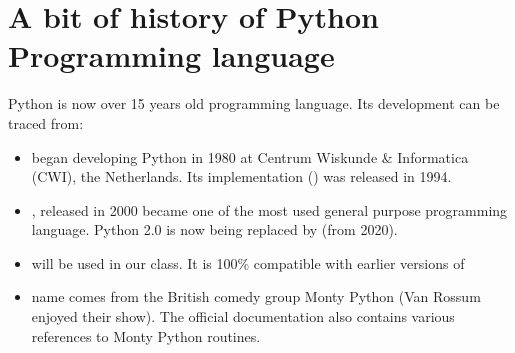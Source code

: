 \documentclass[letterpaper,10pt,english]{jupyterBook}
\begin{document}
\section{A bit of history of Python Programming language}
\label{\detokenize{content/background/01_python:a-bit-of-history-of-python-programming-language}}
\sphinxAtStartPar
Python is now over 15 years old programming language. Its development can be traced from:
\begin{itemize}
\item {} 
\sphinxAtStartPar
{} began developing Python in 1980 at Centrum Wiskunde \& Informatica (CWI), the Netherlands. Its implementation () was released in 1994.

\item {} 
\sphinxAtStartPar
{}, released in 2000 became one of the most used general purpose programming language. Python 2.0 is now being replaced by  (from 2020).

\item {} 
\sphinxAtStartPar
{} will be used in our class. It is  100\% compatible with earlier versions of 

\item {} 
\sphinxAtStartPar
{} name comes from the British comedy group Monty Python (Van Rossum enjoyed their show). The official  documentation  also contains various references to Monty Python routines.

\end{itemize}
\end{document}
